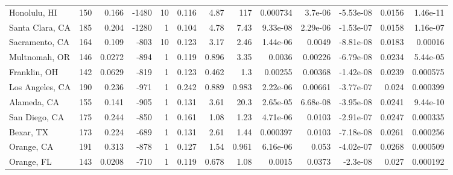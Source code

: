 \documentclass[12pt,letterpaper]{article}
\begin{document}
\begin{appendices}
\begin{sidewaystable}
{\begin{tabular}{lrrrrrrrrrrrr}
 Honolulu, HI       & 150   & 0.166   & -1480 &    10 &           0.116 &            4.87  &        117     &    0.000734  &     3.7e-06  &        -5.53e-08 &           0.0156  &       1.46e-11  \\
 Santa Clara, CA    & 185   & 0.204   & -1280 &     1 &           0.104 &            4.78  &          7.43  &    9.33e-08  &     2.29e-06 &        -1.53e-07 &           0.0158  &       1.16e-07  \\
 Sacramento, CA     & 164   & 0.109   &  -803 &    10 &           0.123 &            3.17  &          2.46  &    1.44e-06  &     0.0049   &        -8.81e-08 &           0.0183  &       0.00016   \\
 Multnomah, OR      & 146   & 0.0272  &  -894 &     1 &           0.119 &            0.896 &          3.35  &    0.0036    &     0.00226  &        -6.79e-08 &           0.0234  &       5.44e-05  \\
 Franklin, OH       & 142   & 0.0629  &  -819 &     1 &           0.123 &            0.462 &          1.3   &    0.00255   &     0.00368  &        -1.42e-08 &           0.0239  &       0.000575  \\
 Los Angeles, CA    & 190   & 0.236   &  -971 &     1 &           0.242 &            0.889 &          0.983 &    2.22e-06  &     0.00661  &        -3.77e-07 &           0.024   &       0.000399  \\
 Alameda, CA        & 155   & 0.141   &  -905 &     1 &           0.131 &            3.61  &         20.3   &    2.65e-05  &     6.68e-08 &        -3.95e-08 &           0.0241  &       9.44e-10  \\
 San Diego, CA      & 175   & 0.244   &  -850 &     1 &           0.161 &            1.08  &          1.23  &    4.71e-06  &     0.0103   &        -2.91e-07 &           0.0247  &       0.000335  \\
 Bexar, TX          & 173   & 0.224   &  -689 &     1 &           0.131 &            2.61  &          1.44  &    0.000397  &     0.0103   &        -7.18e-08 &           0.0261  &       0.000256  \\
 Orange, CA         & 191   & 0.313   &  -878 &     1 &           0.127 &            1.54  &          0.961 &    6.16e-06  &     0.053    &        -4.02e-07 &           0.0268  &       0.000509  \\
 Orange, FL         & 143   & 0.0208  &  -710 &     1 &           0.119 &            0.678 &          1.08  &    0.0015    &     0.0373   &        -2.3e-08  &           0.027   &       0.000192  \\

\end{tabular}}
\end{sidewaystable}
\end{appendices}
\end{document}
